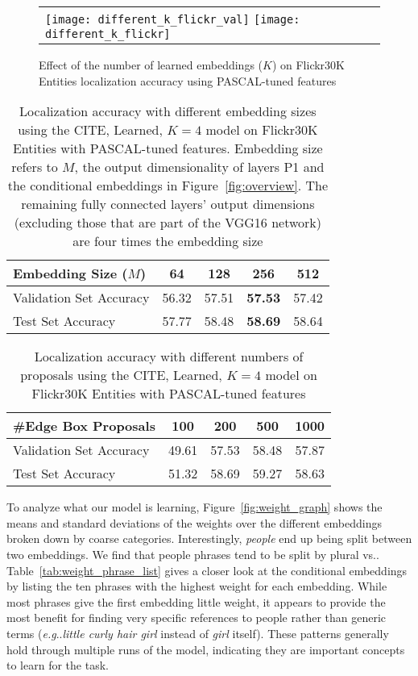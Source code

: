 \documentclass[runningheads]{llncs}
\makeatletter
\DeclareRobustCommand\onedot{\futurelet\@let@token\@onedot}
\def\@onedot{\ifx\@let@token.\else.\null\fi\xspace}
\def\eg{\emph{e.g}\onedot} \def\Eg{\emph{E.g}\onedot}
\makeatother
\begin{document}
\smallskip\begin{figure}[t]
\centering
\begin{tabular}{lr}
\texttt{[image: different\_k\_flickr\_val]}
\texttt{[image: different\_k\_flickr]}
\end{tabular}
\caption{Effect of the number of learned embeddings ($K$) on Flickr30K Entities localization accuracy using PASCAL-tuned features}
\label{fig:choice_of_K}
\end{figure}\begin{table}[t]
\centering
\caption{Localization accuracy with different embedding sizes using the CITE, Learned, $K = 4$ model on Flickr30K Entities with PASCAL-tuned features.  Embedding size refers to $M$, the output dimensionality of layers P1 and the conditional embeddings in Figure~\ref{fig:overview}.  The remaining fully connected layers' output dimensions (excluding those that are part of the VGG16 network) are four times the embedding size}
\label{tab:embedding_size}
\begin{tabular}{|l|c|c|c|c|}
\hline
Embedding Size ($M$) & 64 & 128 & 256 & 512\\
\hline
Validation Set Accuracy & 56.32 & 57.51 & {\bf 57.53} & 57.42 \\
\hline
Test Set Accuracy & 57.77 & 58.48 & {\bf 58.69} & 58.64\\
\hline
\end{tabular}
\end{table}\begin{table}[t]
\centering
\caption{Localization accuracy with different numbers of proposals using the CITE, Learned, $K = 4$ model on Flickr30K Entities with PASCAL-tuned features}
\label{tab:num_proposals}
\begin{tabular}{|l|c|c|c|c|}
\hline
\#Edge Box Proposals & 100 & 200 & 500 & 1000\\
\hline
Validation Set Accuracy & 49.61 & 57.53 & 58.48  & 57.87\\
\hline
Test Set Accuracy & 51.32 & 58.69 & 59.27 & 58.63\\
\hline
\end{tabular}
\end{table} To analyze what our model is learning, Figure~\ref{fig:weight_graph} shows the means and standard deviations of the weights over the different embeddings broken down by coarse categories. Interestingly, {\em people} end up being split between two embeddings. We find that people phrases tend to be split by plural vs.\singular.  Table~\ref{tab:weight_phrase_list} gives a closer look at the conditional embeddings by listing the ten phrases with the highest weight for each embedding.  While most phrases give the first embedding little weight, it appears to provide the most benefit for finding very specific references to people rather than generic terms (\eg\emph{little curly hair girl} instead of \emph{girl} itself).  These patterns generally hold through multiple runs of the model, indicating they are important concepts to learn for the task.
\end{document}
